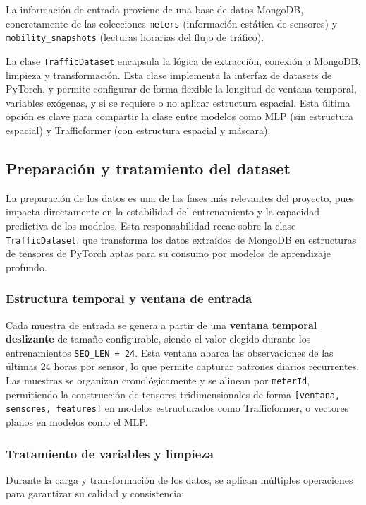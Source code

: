 La información de entrada proviene de una base de datos MongoDB, concretamente de las colecciones \texttt{meters} (información estática de sensores) y \texttt{mobility\_snapshots} (lecturas horarias del flujo de tráfico).

La clase \texttt{TrafficDataset} encapsula la lógica de extracción, conexión a MongoDB, limpieza y transformación. Esta clase implementa la interfaz de datasets de PyTorch, y permite configurar de forma flexible la longitud de ventana temporal, variables exógenas, y si se requiere o no aplicar estructura espacial. Esta última opción es clave para compartir la clase entre modelos como MLP (sin estructura espacial) y Trafficformer (con estructura espacial y máscara).

\subsection{Preparación y tratamiento del dataset}

La preparación de los datos es una de las fases más relevantes del proyecto, pues impacta directamente en la estabilidad del entrenamiento y la capacidad predictiva de los modelos. Esta responsabilidad recae sobre la clase \texttt{TrafficDataset}, que transforma los datos extraídos de MongoDB en estructuras de tensores de PyTorch aptas para su consumo por modelos de aprendizaje profundo.

\subsubsection*{Estructura temporal y ventana de entrada}

Cada muestra de entrada se genera a partir de una \textbf{ventana temporal deslizante} de tamaño configurable, siendo el valor elegido durante los entrenamientos \texttt{SEQ\_LEN = 24}. Esta ventana abarca las observaciones de las últimas 24 horas por sensor, lo que permite capturar patrones diarios recurrentes. Las muestras se organizan cronológicamente y se alinean por \texttt{meterId}, permitiendo la construcción de tensores tridimensionales de forma \texttt{[ventana, sensores, features]} en modelos estructurados como Trafficformer, o vectores planos en modelos como el MLP.

\subsubsection*{Tratamiento de variables y limpieza}

Durante la carga y transformación de los datos, se aplican múltiples operaciones para garantizar su calidad y consistencia:

